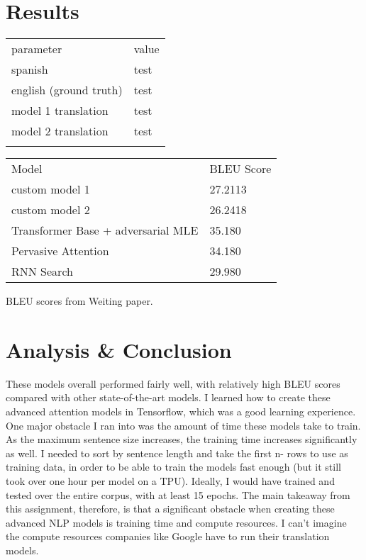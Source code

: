 \documentclass{article}
\begin{document}
\section{Results}

\begin{table}
\begin{tabular}{ll}
parameter              & value \\
spanish                & test  \\
english (ground truth) & test  \\
model 1 translation    & test  \\
model 2 translation    & test  \\
                        &      
\end{tabular}
\end{table}

\begin{table}
\begin{tabular}{ll}
Model                              & BLEU Score \\
custom model 1                     & 27.2113    \\
custom model 2                     & 26.2418    \\
Transformer Base + adversarial MLE & 35.180     \\
Pervasive Attention                & 34.180     \\
RNN Search                         & 29.980    
\end{tabular}
\end{table}

BLEU scores from Weiting \cite{wieting2019beyond} paper.

\section{Analysis \& Conclusion}

These models overall performed fairly well, with relatively high BLEU scores compared with other state-of-the-art models. I learned how to create these advanced attention models in Tensorflow, which was a good learning experience. One major obstacle I ran into was the amount of time these models take to train. As the maximum sentence size increases, the training time increases significantly as well. I needed to sort by sentence length and take the first n- rows to use as training data, in order to be able to train the models fast enough (but it still took over one hour per model on a TPU). Ideally, I would have trained and tested over the entire corpus, with at least 15 epochs. The main takeaway from this assignment, therefore, is that a significant obstacle when creating these advanced NLP models is training time and compute resources. I can't imagine the compute resources companies like Google have to run their translation models.

\begin{footnotesize}


\end{footnotesize}
\end{document}
